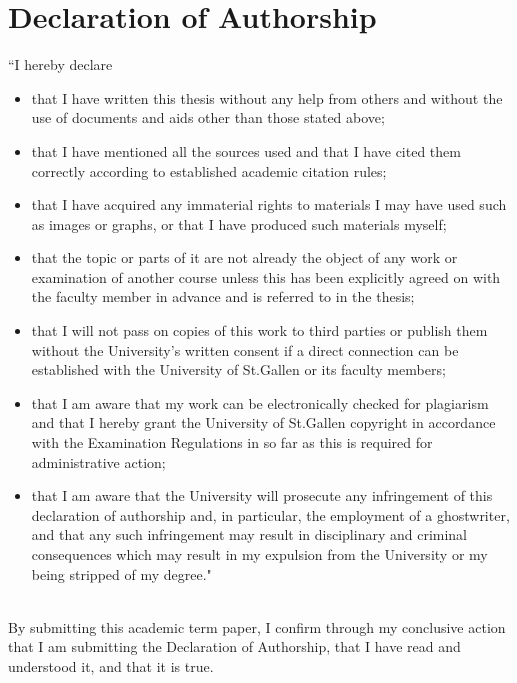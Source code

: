 \documentclass[11pt,a4paper,english,oneside]{book}
\numberwithin{equation}{chapter}
\begin{document}
\newpage
{\pagestyle{firststyle}
	
\chapter*{Declaration of Authorship}

``I hereby declare
\begin{itemize}
	\item that I have written this thesis without any help from others and without the use of
	documents and aids other than those stated above;
	\item that I have mentioned all the sources used and that I have cited them correctly
	according to established academic citation rules;
	\item that I have acquired any immaterial rights to materials I may have used such as images
	or graphs, or that I have produced such materials myself;
	\item that the topic or parts of it are not already the object of any work or examination of
	another course unless this has been explicitly agreed on with the faculty member in
	advance and is referred to in the thesis;
	\item that I will not pass on copies of this work to third parties or publish them without the
	University’s written consent if a direct connection can be established with the
	University of St.Gallen or its faculty members;
	\item that I am aware that my work can be electronically checked for plagiarism and that I
	hereby grant the University of St.Gallen copyright in accordance with the Examination
	Regulations in so far as this is required for administrative action;
	\item that I am aware that the University will prosecute any infringement of this declaration
	of authorship and, in particular, the employment of a ghostwriter, and that any such
	infringement may result in disciplinary and criminal consequences which may result
	in my expulsion from the University or my being stripped of my degree."
\end{itemize}


\vspace*{3cm}


 \hfill {}\\

\vspace*{.5 cm}
\noindent By submitting this academic term paper, I confirm through my conclusive action that I am
submitting the Declaration of Authorship, that I have read and understood it, and that it is
true.
\cleardoublepage
}
\end{document}
